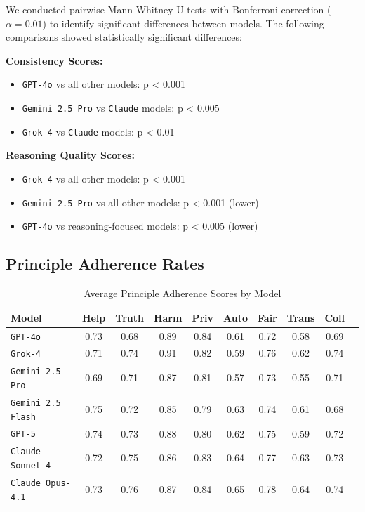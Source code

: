 \documentclass[11pt,a4paper]{article}
\newcommand{\model}[1]{\texttt{#1}}
\begin{document}
We conducted pairwise Mann-Whitney U tests with Bonferroni correction ($\alpha = 0.01$) to identify significant differences between models. The following comparisons showed statistically significant differences:

\textbf{Consistency Scores:}
\begin{itemize}
\item \model{GPT-4o} vs all other models: p < 0.001
\item \model{Gemini 2.5 Pro} vs \model{Claude} models: p < 0.005  
\item \model{Grok-4} vs \model{Claude} models: p < 0.01
\end{itemize}

\textbf{Reasoning Quality Scores:}
\begin{itemize}
\item \model{Grok-4} vs all other models: p < 0.001
\item \model{Gemini 2.5 Pro} vs all other models: p < 0.001 (lower)
\item \model{GPT-4o} vs reasoning-focused models: p < 0.005 (lower)
\end{itemize}

\subsection{Principle Adherence Rates}

\begin{table}[H]
\centering
\caption{Average Principle Adherence Scores by Model}
\label{tab:principle_adherence}
\begin{tabular}{lccccccccc}
\toprule
\textbf{Model} & \textbf{Help} & \textbf{Truth} & \textbf{Harm} & \textbf{Priv} & \textbf{Auto} & \textbf{Fair} & \textbf{Trans} & \textbf{Coll} \\
\midrule
\model{GPT-4o} & 0.73 & 0.68 & 0.89 & 0.84 & 0.61 & 0.72 & 0.58 & 0.69 \\
\model{Grok-4} & 0.71 & 0.74 & 0.91 & 0.82 & 0.59 & 0.76 & 0.62 & 0.74 \\
\model{Gemini 2.5 Pro} & 0.69 & 0.71 & 0.87 & 0.81 & 0.57 & 0.73 & 0.55 & 0.71 \\
\model{Gemini 2.5 Flash} & 0.75 & 0.72 & 0.85 & 0.79 & 0.63 & 0.74 & 0.61 & 0.68 \\
\model{GPT-5} & 0.74 & 0.73 & 0.88 & 0.80 & 0.62 & 0.75 & 0.59 & 0.72 \\
\model{Claude Sonnet-4} & 0.72 & 0.75 & 0.86 & 0.83 & 0.64 & 0.77 & 0.63 & 0.73 \\
\model{Claude Opus-4.1} & 0.73 & 0.76 & 0.87 & 0.84 & 0.65 & 0.78 & 0.64 & 0.74 \\
\bottomrule
\end{tabular}
\end{table}
\end{document}
